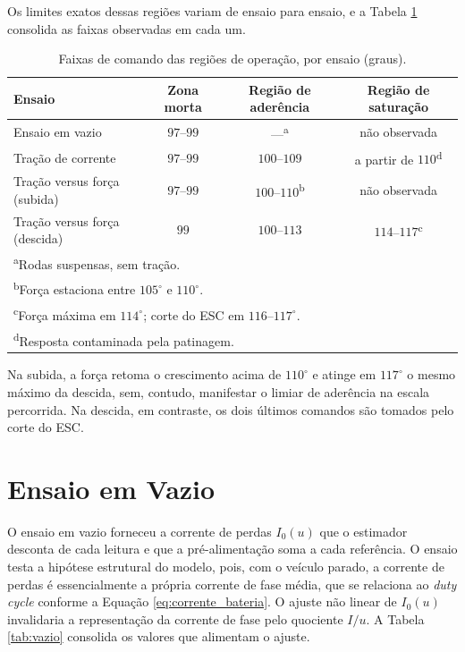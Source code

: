 Os limites exatos dessas regiões variam de ensaio para ensaio, e a Tabela \ref{tab:zonas}
consolida as faixas observadas em cada um.

\begin{table}[htb]
\centering
\caption{Faixas de comando das regiões de operação, por ensaio (graus).}
\label{tab:zonas}
\small
\renewcommand{\arraystretch}{1.2}
\begin{tabular}{l c c c}
\hline
Ensaio & Zona morta & Região de aderência & Região de saturação \\
\hline
Ensaio em vazio & $97$--$99$ & ---\textsuperscript{a} & não observada \\
Tração de corrente & $97$--$99$ & $100$--$109$ & a partir de $110$\textsuperscript{d} \\
Tração versus força (subida) & $97$--$99$ & $100$--$110$\textsuperscript{b} & não observada \\
Tração versus força (descida) & $99$ & $100$--$113$ & $114$--$117$\textsuperscript{c} \\
\hline
\multicolumn{4}{l}{\rule{0pt}{2.5ex}\textsuperscript{a}\footnotesize{Rodas suspensas, sem tração.}}\\
\multicolumn{4}{l}{\textsuperscript{b}\footnotesize{Força estaciona entre $105^\circ$ e $110^\circ$.}}\\
\multicolumn{4}{l}{\textsuperscript{c}\footnotesize{Força máxima em $114^\circ$; corte do ESC em $116$--$117^\circ$.}}\\
\multicolumn{4}{l}{\textsuperscript{d}\footnotesize{Resposta contaminada pela patinagem.}}\\
\end{tabular}
\end{table}

Na subida, a força retoma o crescimento acima de $110^\circ$ e atinge em $117^\circ$ o
mesmo máximo da descida, sem, contudo, manifestar o limiar de aderência na escala
percorrida. Na descida, em contraste, os dois últimos comandos são tomados pelo corte do
ESC.

\section{Ensaio em Vazio}
\label{sec:resvazio}

O ensaio em vazio forneceu a corrente de perdas $I_0(u)$ que o estimador desconta de cada
leitura e que a pré-alimentação soma a cada referência. O ensaio
testa a hipótese estrutural do modelo, pois, com
o veículo parado, a corrente de perdas é essencialmente a própria corrente de fase média,
que se relaciona ao \emph{duty cycle} conforme a Equação \eqref{eq:corrente_bateria}.
O ajuste não linear de $I_0(u)$ invalidaria a representação da corrente de fase
pelo quociente $I/u$. A Tabela \ref{tab:vazio} consolida os valores que alimentam o ajuste.

